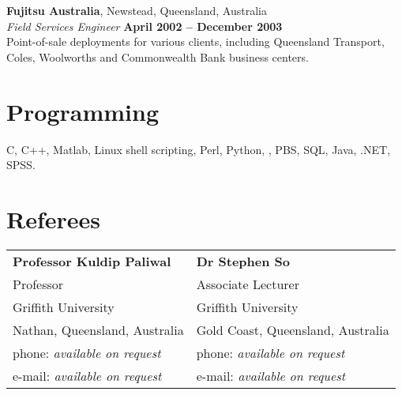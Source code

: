 \documentclass[margin,line]{resume}
\begin{document}
\begin{resume}
    \textbf{Fujitsu Australia}, Newstead, Queensland, Australia \vspace{2mm}\\\vspace{1mm}%
    \textsl{Field Services Engineer} \hfill \textbf{April 2002 -- December 2003}\\
    Point-of-sale deployments for various clients, 
    including Queensland Transport, Coles, Woolworths and Commonwealth Bank business centers. 



    \section{\mysidestyle Programming} 

    C, C++, Matlab, Linux shell scripting, Perl, Python, \LaTeXe, PBS, SQL, Java, .NET, SPSS.






\section{\mysidestyle Referees} 

\begin{tabular}{@{}p{6cm}p{6cm}}
\textbf{Professor Kuldip Paliwal}       &  \textbf{Dr Stephen So}                   \\
Professor                               &  Associate Lecturer                       \\
Griffith University                     &  Griffith University                      \\
Nathan, Queensland, Australia           &  Gold Coast, Queensland, Australia        \\
phone: \textsl{available on request}    &  phone: \textsl{available on request}     \\
e-mail: \textsl{available on request}   &  e-mail: \textsl{available on request}    \\
\end{tabular}


\end{resume}
\end{document}

